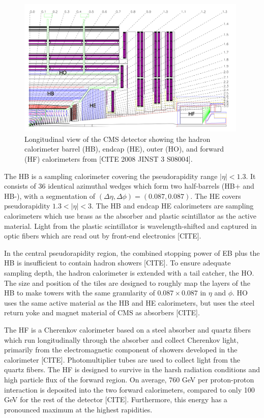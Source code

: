 \documentclass{article}
\begin{document}
\begin{figure}[ht]
    \centering
    \includegraphics[width=11cm]{figures/phase-1-HCAL-schematic.png}
    \caption{Longitudinal view of the CMS detector showing the hadron calorimeter barrel (HB), endcap (HE), outer (HO), and forward (HF) calorimeters from [CITE 2008 JINST 3 S08004].}
    \label{fig:phase-1-HCAL-schematic}
\end{figure}


The HB is a sampling calorimeter covering the pseudorapidity range $|\eta| < 1.3$. It consists of 36 identical azimuthal wedges which form two half-barrels (HB+ and HB-), with a segmentation of $(\Delta \eta, \Delta \phi) = (0.087, 0.087)$. The HE covers pseudorapidity $1.3 < |\eta| < 3$. The HB and endcap HE calorimeters are sampling calorimeters which use brass as the absorber and plastic scintillator as the active material. Light from the plastic scintillator is wavelength-shifted and captured in optic fibers which are read out by front-end electronics [CITE]. %

In the central pseudorapidity region, the combined stopping power of EB plus the HB is insufficient to contain hadron showers [CITE]. To ensure adequate sampling depth, the hadron calorimeter is extended with a tail catcher, the HO. The size and position of the tiles are designed to roughly map the layers of the HB to make towers with the same granularity of $0.087 \times 0.087$ in $\eta$ and $\phi$. HO uses the same active material as the HB and HE calorimeters, but uses the steel return yoke and magnet material of CMS as absorbers [CITE]. %

The HF is a Cherenkov calorimeter based on a steel absorber and quartz fibers which run longitudinally through the absorber and collect Cherenkov light, primarily from the electromagnetic component of showers developed in the calorimeter [CITE]. Photomultiplier tubes are used to  collect light from the quartz fibers. The HF is designed to survive in the harsh radiation conditions and high particle flux of the forward region. On average, 760 GeV per proton-proton interaction is deposited into the two forward calorimeters, compared to only 100 GeV for the rest of the detector [CITE]. Furthermore, this energy has a pronounced maximum at the highest rapidities.
\end{document}
